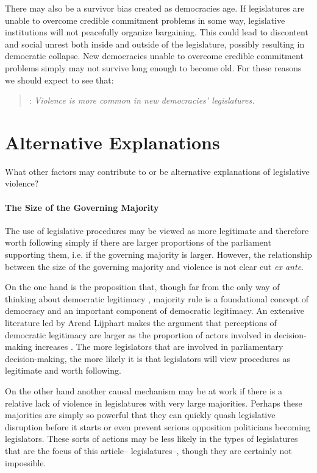 \documentclass[a4paper]{article}\usepackage[]{graphicx}\usepackage[]{color}
\begin{document}
There may also be a survivor bias created as democracies age. If legislatures are unable to overcome credible commitment problems in some way, legislative institutions will not peacefully organize bargaining. This could lead to discontent and social unrest both inside and outside of the legislature, possibly resulting in democratic collapse. New democracies unable to overcome credible commitment problems simply may not survive long enough to become old. For these reasons we should expect to see that:

\begin{quote}
    : \emph{Violence is more common in new democracies' legislatures.}
\end{quote}

\section*{Alternative Explanations}

What other factors may contribute to or be alternative explanations of legislative violence?

\paragraph{The Size of the Governing Majority}

The use of legislative procedures may be viewed as more legitimate and therefore worth following simply if there are larger proportions of the parliament supporting them, i.e. if the governing majority is larger. However, the relationship between the size of the governing majority and violence is not clear cut \emph{ex ante}.

On the one hand is the proposition that, though far from the only way of thinking about democratic legitimacy \cite{Follesdal2006}, majority rule is a foundational concept of democracy \citep{Dahl1989} and an important component of democratic legitimacy. An extensive literature led by Arend Lijphart makes the argument that perceptions of democratic legitimacy are larger as the proportion of actors involved in decision-making increases \citep[]{Lijphart2007}. The more legislators that are involved in parliamentary decision-making, the more likely it is that legislators will view procedures as legitimate and worth following.

On the other hand another causal mechanism may be at work if there is a relative lack of violence in legislatures with very large majorities. Perhaps these majorities are simply so powerful that they can quickly quash legislative disruption before it starts or even prevent serious opposition politicians becoming legislators. These sorts of actions may be less likely in the types of legislatures that are the focus of this article-- legislatures--, though they are certainly not impossible.
\end{document}
